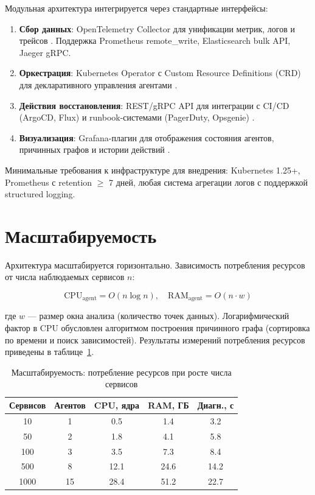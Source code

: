 Модульная архитектура интегрируется через стандартные интерфейсы:

\begin{enumerate}
    \item \textbf{Сбор данных}: OpenTelemetry Collector для унификации метрик, логов и трейсов \cite{opentelemetry,opentelemetry_docs}. Поддержка Prometheus remote\_write, Elasticsearch bulk API, Jaeger gRPC.
    \item \textbf{Оркестрация}: Kubernetes Operator с Custom Resource Definitions (CRD) для декларативного управления агентами \cite{burns_kubernetes,kubernetes_docs}.
    \item \textbf{Действия восстановления}: REST/gRPC API для интеграции с CI/CD (ArgoCD, Flux) и runbook-системами (PagerDuty, Opsgenie) \cite{rfc_7540,grpc_design}.
    \item \textbf{Визуализация}: Grafana-плагин для отображения состояния агентов, причинных графов и истории действий \cite{grafana_docs}.
\end{enumerate}

Минимальные требования к инфраструктуре для внедрения: Kubernetes 1.25+, Prometheus с retention $\geq$ 7 дней, любая система агрегации логов с поддержкой structured logging.

\section{Масштабируемость}

Архитектура масштабируется горизонтально. Зависимость потребления ресурсов от числа наблюдаемых сервисов $n$:

\begin{equation}
\text{CPU}_{\text{agent}} = O(n \log n), \quad \text{RAM}_{\text{agent}} = O(n \cdot w)
\label{eq:scalability}
\end{equation}

где $w$ --- размер окна анализа (количество точек данных). Логарифмический фактор в CPU обусловлен алгоритмом построения причинного графа (сортировка по времени и поиск зависимостей). Результаты измерений потребления ресурсов приведены в таблице~\ref{tab:scalability}.

\begin{table}[H]
\centering
\small
\caption{Масштабируемость: потребление ресурсов при росте числа сервисов}
\label{tab:scalability}
\setlength{\tabcolsep}{3pt}
\begin{tabular}{|c|c|c|c|c|}
\hline
\textbf{Сервисов} & \textbf{Агентов} & \textbf{CPU, ядра} & \textbf{RAM, ГБ} & \textbf{Диагн., с} \\
\hline
10 & 1 & 0.5 & 1.4 & 3.2 \\
\hline
50 & 2 & 1.8 & 4.1 & 5.8 \\
\hline
100 & 3 & 3.5 & 7.3 & 8.4 \\
\hline
500 & 8 & 12.1 & 24.6 & 14.2 \\
\hline
1000 & 15 & 28.4 & 51.2 & 22.7 \\
\hline
\end{tabular}
\end{table}

